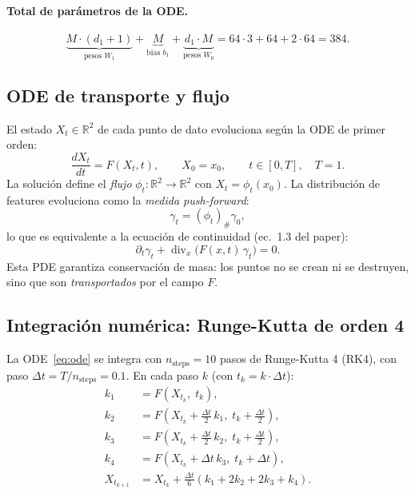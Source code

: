\documentclass[11pt, a4paper]{article}
\theoremstyle{definition}
\newcommand{\R}{\mathbb{R}}
\begin{document}
\paragraph{Total de parámetros de la ODE.}
\begin{equation}
  \underbrace{M \cdot (d_1+1)}_{\text{pesos } W_1} +
  \underbrace{M}_{\text{bias } b_1} +
  \underbrace{d_1 \cdot M}_{\text{pesos } W_0}
  = 64 \cdot 3 + 64 + 2 \cdot 64 = 384.
\end{equation}

\subsection{ODE de transporte y flujo}
\label{sec:ode}

El estado $X_t \in \R^2$ de cada punto de dato evoluciona según la ODE de
primer orden:
\begin{equation}
  \label{eq:ode}
  \frac{dX_t}{dt} = F(X_t, t), \qquad X_0 = x_0, \qquad t \in [0, T],
  \quad T = 1.
\end{equation}
La solución define el \emph{flujo} $\phi_t : \R^2 \to \R^2$ con
$X_t = \phi_t(x_0)$. La distribución de features evoluciona como la
\emph{medida push-forward}:
\begin{equation}
  \gamma_t = (\phi_t)_\# \gamma_0,
\end{equation}
lo que es equivalente a la ecuación de continuidad (ec.~1.3 del paper):
\begin{equation}
  \partial_t \gamma_t + \operatorname{div}_x\!\bigl(F(x,t)\,\gamma_t\bigr) = 0.
\end{equation}
Esta PDE garantiza conservación de masa: los puntos no se crean ni se destruyen,
sino que son \emph{transportados} por el campo $F$.

\subsection{Integración numérica: Runge-Kutta de orden 4}
\label{sec:rk4}

La ODE~\eqref{eq:ode} se integra con $n_\text{steps} = 10$ pasos de
Runge-Kutta 4 (RK4), con paso $\Delta t = T / n_\text{steps} = 0.1$.
En cada paso $k$ (con $t_k = k \cdot \Delta t$):
\begin{align}
  k_1 &= F(X_{t_k},\; t_k), \\
  k_2 &= F\!\left(X_{t_k} + \tfrac{\Delta t}{2}\,k_1,\;
                  t_k + \tfrac{\Delta t}{2}\right), \\
  k_3 &= F\!\left(X_{t_k} + \tfrac{\Delta t}{2}\,k_2,\;
                  t_k + \tfrac{\Delta t}{2}\right), \\
  k_4 &= F\!\left(X_{t_k} + \Delta t\,k_3,\;
                  t_k + \Delta t\right), \\
  X_{t_{k+1}} &= X_{t_k} + \frac{\Delta t}{6}(k_1 + 2k_2 + 2k_3 + k_4).
\end{align}
\end{document}
